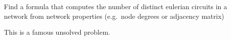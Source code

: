 
Find a formula that computes the number of distinct eulerian circuits in a network from network properties (e.g.~node degrees or adjacency matrix) 

\solution
This is a famous unsolved problem.

\solutionend